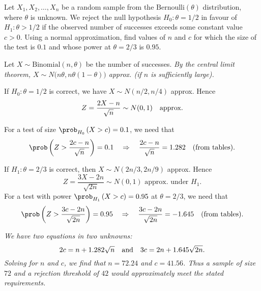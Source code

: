 \begin{example}
Let $X_1,X_2,\ldots,X_n$ be a random sample from the $\text{Bernoulli}(\theta)$ distribution, where $\theta$ is unknown. We reject the null hypothesis $H_0:\theta=1/2$ in favour of $H_1:\theta>1/2$ if the observed number of successes exceeds some constant value $c>0$. Using a normal approximation, find values of $n$ and $c$ for which the size of the test is $0.1$ and whose power at $\theta=2/3$ is $0.95$. 
\end{example}

\begin{solution}
Let $X\sim\text{Binomial}(n,\theta)$ be the number of successes. 
\bit
\it By the central limit theorem, $X\sim N\big(n\theta,n\theta(1-\theta)\big)$ approx. (if $n$ is sufficiently large).
\eit

\vspace*{2ex}
If $H_0:\theta=1/2$ is correct, we have $X\sim N(n/2,n/4)$ approx. Hence
\[
Z 
	= \frac{2X-n}{\sqrt{n}} \sim N(0,1) \text{\quad approx.}
\]

\vspace*{2ex}
For a test of size $\prob_{H_0}\left(X > c\right) = 0.1$, we need that 
\[
\prob\left(Z > \frac{2c-n}{\sqrt{n}}\right) = 0.1
\quad\Rightarrow\quad
\frac{2c-n}{\sqrt{n}} = 1.282 \text{\quad (from tables).}
\]



If $H_1:\theta=2/3$ is correct, then $X\sim N(2n/3,2n/9)$ approx. Hence
\[
Z = \frac{3X-2n}{\sqrt{2n}} \sim N(0,1) \text{ approx. under $H_1$.}
\]
For a test with power $\prob_{H_1}\left(X > c\right) = 0.95$ at $\theta=2/3$, we need that
\[
\prob\left(Z > \frac{3c-2n}{\sqrt{2n}}\right) = 0.95
\quad\Rightarrow\quad
\frac{3c-2n}{\sqrt{2n}} = -1.645 \text{\quad (from tables).}
\]

\bit
\it We have two equations in two unknowns:
\[
2c = n + 1.282\sqrt{n} \text{\quad and\quad} 3c = 2n + 1.645\sqrt{2n}.
\]
\it Solving for $n$ and $c$, we find that $n=72.24$ and $c=41.56$.
\it Thus a sample of size $72$ and a rejection threshold of $42$ would approximately meet the stated requirements.
\eit
\end{solution}

